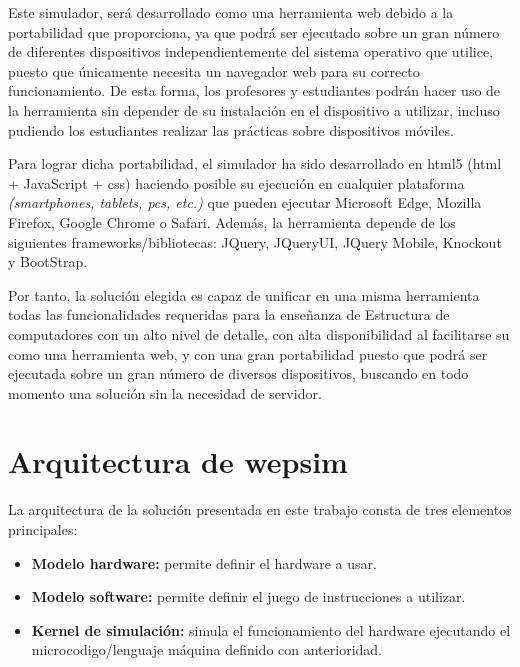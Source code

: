 Este simulador, será desarrollado como una herramienta web debido a la portabilidad que proporciona, ya que podrá ser ejecutado sobre un gran número de diferentes dispositivos independientemente del sistema operativo que utilice, puesto que únicamente necesita un navegador web para su correcto funcionamiento. De esta forma, los profesores y estudiantes podrán hacer uso de la herramienta sin depender de su instalación en el dispositivo a utilizar, incluso pudiendo los estudiantes realizar las prácticas sobre dispositivos móviles.

Para lograr dicha portabilidad, el simulador ha sido desarrollado en \acrshort{html}5 (\acrshort{html} + JavaScript + \acrshort{css}) haciendo posible su ejecución en cualquier plataforma \emph{(smartphones, tablets, \acrshort{pc}s, etc.)} que pueden ejecutar Microsoft Edge, Mozilla Firefox, Google Chrome o Safari. Además, la herramienta depende de los siguientes frameworks/bibliotecas: JQuery, JQueryUI, JQuery Mobile, Knockout y BootStrap.

Por tanto, la solución elegida es capaz de unificar en una misma herramienta todas las funcionalidades requeridas para la enseñanza de Estructura de computadores con un alto nivel de detalle, con alta disponibilidad al facilitarse su como una herramienta web, y con una gran portabilidad puesto que podrá ser ejecutada sobre un gran número de diversos dispositivos, buscando en todo momento una solución sin la necesidad de servidor.

\clearpage

\section{Arquitectura de \acrshort{wepsim}}
\label{sec:simulator_architecture}

La arquitectura de la solución presentada en este trabajo consta de tres elementos principales:

\begin{itemize}
\item \textbf{Modelo \gls{hardware}:} permite definir el \gls{hardware} a usar.
\item \textbf{Modelo \gls{software}:} permite definir el juego de instrucciones a utilizar.
\item \textbf{Kernel de simulación:} simula el funcionamiento del \gls{hardware} ejecutando el \gls{microcodigo}/lenguaje máquina definido con anterioridad.
\end{itemize}

